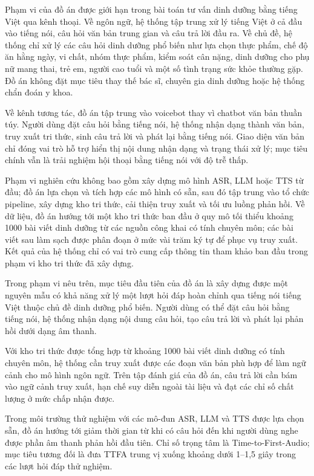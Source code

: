 \documentclass[a4paper,13pt,twoside]{report}
\begin{document}
Phạm vi của đồ án được giới hạn trong bài toán tư vấn dinh dưỡng bằng tiếng Việt qua kênh thoại. Về ngôn ngữ, hệ thống tập trung xử lý tiếng Việt ở cả đầu vào tiếng nói, câu hỏi văn bản trung gian và câu trả lời đầu ra. Về chủ đề, hệ thống chỉ xử lý các câu hỏi dinh dưỡng phổ biến như lựa chọn thực phẩm, chế độ ăn hằng ngày, vi chất, nhóm thực phẩm, kiểm soát cân nặng, dinh dưỡng cho phụ nữ mang thai, trẻ em, người cao tuổi và một số tình trạng sức khỏe thường gặp. Đồ án không đặt mục tiêu thay thế bác sĩ, chuyên gia dinh dưỡng hoặc hệ thống chẩn đoán y khoa.

Về kênh tương tác, đồ án tập trung vào voicebot thay vì chatbot văn bản thuần túy. Người dùng đặt câu hỏi bằng tiếng nói, hệ thống nhận dạng thành văn bản, truy xuất tri thức, sinh câu trả lời và phát lại bằng tiếng nói. Giao diện văn bản chỉ đóng vai trò hỗ trợ hiển thị nội dung nhận dạng và trạng thái xử lý; mục tiêu chính vẫn là trải nghiệm hội thoại bằng tiếng nói với độ trễ thấp.

Phạm vi nghiên cứu không bao gồm xây dựng mô hình ASR, LLM hoặc TTS từ đầu; đồ án lựa chọn và tích hợp các mô hình có sẵn, sau đó tập trung vào tổ chức pipeline, xây dựng kho tri thức, cải thiện truy xuất và tối ưu luồng phản hồi. Về dữ liệu, đồ án hướng tới một kho tri thức ban đầu ở quy mô tối thiểu khoảng 1000 bài viết dinh dưỡng từ các nguồn công khai có tính chuyên môn; các bài viết sau làm sạch được phân đoạn ở mức vài trăm ký tự để phục vụ truy xuất. Kết quả của hệ thống chỉ có vai trò cung cấp thông tin tham khảo ban đầu trong phạm vi kho tri thức đã xây dựng.

Trong phạm vi nêu trên, mục tiêu đầu tiên của đồ án là xây dựng được một nguyên mẫu có khả năng xử lý một lượt hỏi đáp hoàn chỉnh qua tiếng nói tiếng Việt thuộc chủ đề dinh dưỡng phổ biến. Người dùng có thể đặt câu hỏi bằng tiếng nói, hệ thống nhận dạng nội dung câu hỏi, tạo câu trả lời và phát lại phản hồi dưới dạng âm thanh.

Với kho tri thức được tổng hợp từ khoảng 1000 bài viết dinh dưỡng có tính chuyên môn, hệ thống cần truy xuất được các đoạn văn bản phù hợp để làm ngữ cảnh cho mô hình ngôn ngữ. Trên tập đánh giá của đồ án, câu trả lời cần bám vào ngữ cảnh truy xuất, hạn chế suy diễn ngoài tài liệu và đạt các chỉ số chất lượng ở mức chấp nhận được.

Trong môi trường thử nghiệm với các mô-đun ASR, LLM và TTS được lựa chọn sẵn, đồ án hướng tới giảm thời gian từ khi có câu hỏi đến khi người dùng nghe được phần âm thanh phản hồi đầu tiên. Chỉ số trọng tâm là Time-to-First-Audio; mục tiêu tương đối là đưa TTFA trung vị xuống khoảng dưới 1--1,5 giây trong các lượt hỏi đáp thử nghiệm.
\end{document}
